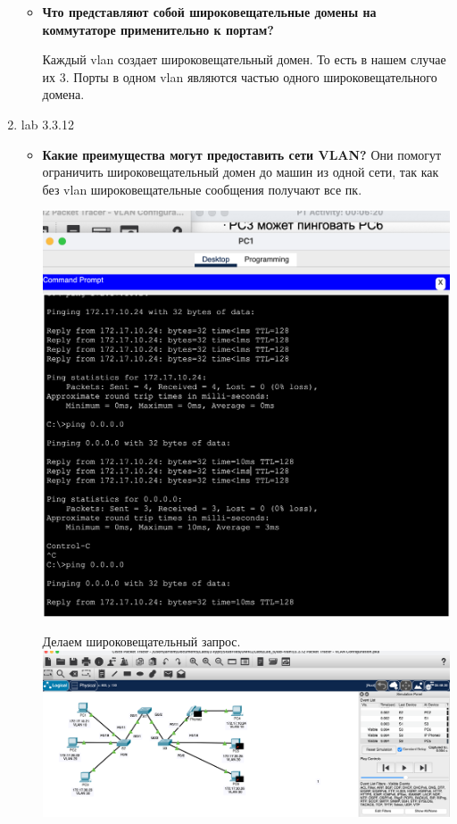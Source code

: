 \documentclass[a4paper,14pt]{extarticle}
\begin{document}
\begin{enumerate}
\begin{itemize}
            \item \textbf{Что представляют собой широковещательные домены на коммутаторе применительно к портам?}\par
                Каждый vlan создает широковещательный домен. То есть в нашем случае их 3. Порты в одном vlan являются частью одного широковещательного домена.

        \end{itemize}
        \item lab 3.3.12
        \begin{itemize}
            \item \textbf{Какие преимущества могут предоставить сети VLAN?}
                Они помогут ограничить широковещательный домен до машин из одной сети, так как без vlan широковещательные сообщения получают все пк.
                \begin{center}
                    \includegraphics[scale=0.5]{pics/3.3.12_2.png}
                    
                    Делаем широковещательный запрос.
                    \includegraphics[scale=0.3]{pics/3.3.12_1.png}
                \end{center}


\end{itemize}
\end{enumerate}
\end{document}
